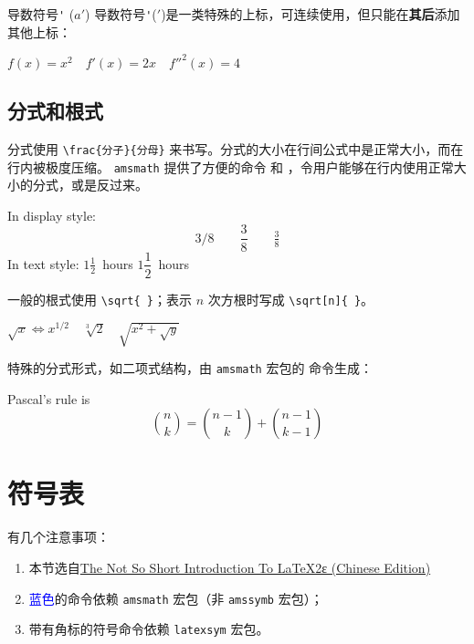 {导数符号\texttt' ($a'$)}
导数符号\texttt'(${}'$)是一类特殊的上标，可连续使用，但只能在\textbf{其后}添加其他上标：

\begin{codeshow}
    $f(x) = x^2 \quad f'(x)
        = 2x \quad f''^{2}(x) = 4$
\end{codeshow}

\subsection{分式和根式}\label{subsec:frac-sqrt}
分式使用 \lstinline|\frac{分子}{分母}| 来书写。分式的大小在行间公式中是正常大小，而在行内被极度压缩。
\lstinline{amsmath} 提供了方便的命令  和 ，令用户能够在行内使用正常大小的分式，或是反过来。

\begin{codeshow}
    In display style:
    \[
        3/8 \qquad \frac{3}{8}
        \qquad \tfrac{3}{8}
    \]
    In text style:
    $1\frac{1}{2}$~hours \qquad
    $1\dfrac{1}{2}$~hours
\end{codeshow}

一般的根式使用 \lstinline|\sqrt{ }|；表示 $n$ 次方根时写成 \lstinline|\sqrt[n]{ }|。

\begin{codeshow}
    $\sqrt{x} \Leftrightarrow x^{1/2}
        \quad \sqrt[3]{2}
        \quad \sqrt{x^{2} + \sqrt{y}}$
\end{codeshow}


特殊的分式形式，如二项式结构，由 \lstinline{amsmath} 宏包的  命令生成：

\begin{codeshow}
    Pascal's rule is
    \[
        \binom{n}{k} =\binom{n-1}{k}
        + \binom{n-1}{k-1}
    \]
\end{codeshow}

\section{符号表}\label{sec:math-tables}

有几个注意事项：
\begin{enumerate}
    \item 本节选自\href{https://github.com/CTeX-org/lshort-zh-cn/tree/master}{The Not So Short Introduction To LaTeX2ε (Chinese Edition)}
    \item \textcolor{blue}{蓝色}的命令依赖 \lstinline{amsmath} 宏包（非 \lstinline{amssymb} 宏包）；
    \item 带有角标\lsym 的符号命令依赖 \lstinline{latexsym} 宏包。
\end{enumerate}

